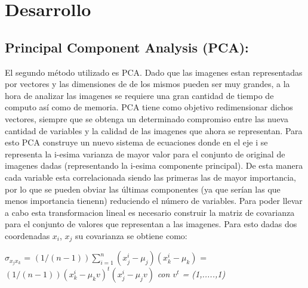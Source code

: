 \section{Desarrollo}

\subsection{Principal Component Analysis (PCA):}


El segundo método utilizado es PCA. Dado que las imagenes estan representadas por vectores y las dimensiones de de los mismos pueden ser muy grandes, a la hora de analizar las imagenes se requiere una gran cantidad de tiempo de computo así como de memoria. PCA tiene como objetivo redimensionar dichos vectores, siempre que se obtenga un determinado compromiso entre las nueva cantidad de variables y la calidad de las imagenes que ahora se representan. Para esto PCA construye un nuevo sistema de ecuaciones donde en el eje i se representa la i-esima varianza de mayor valor para el conjunto de original de imagenes dadas (representando la i-esima componente principal). De esta manera cada variable esta correlacionada siendo las primeras las de mayor importancia, por lo que se pueden obviar las últimas componentes (ya que serían las que menos importancia tienenn) reduciendo el número de variables. Para poder llevar a cabo esta transformacion lineal es necesario construir la matriz de covarianza para el conjunto de valores que representan a las imagenes.
Para esto dadas dos coordenadas $x_i$, $x_j$ su covarianza se obtiene como: \newline


$\sigma_{x_j x_k}$ = $(1/(n-1))\sum_{i=1}^{n}(x_{j}^{i}-\mu_j)(x_{k}^{i}-\mu_k)$  = $(1/(n-1))(x_{k}^{i}-\mu_kv)^{t}(x_{j}^{i}-\mu_jv)$ \newline
\textit{con $v^{t}$ = (1,.....,1)}\newline

